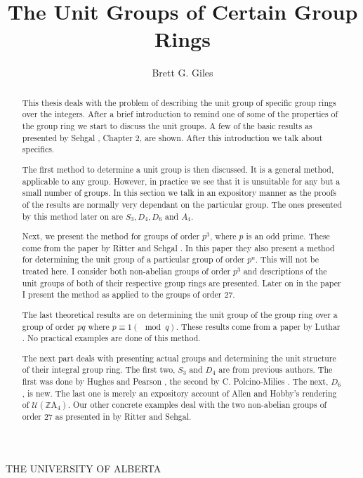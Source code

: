 \documentclass[11pt]{report}
\begin{document}
\nocite{bib:allen1980,bib:hughes1972,bib:luthar1980,bib:polcino1972,bib:sehgal78}
\degree{\MSc}%

%
%

%
%
%
%


%
%

THE UNIVERSITY OF ALBERTA



\title{The Unit Groups of Certain Group Rings}
\author{Brett G. Giles}
\admin
\doublespacing
\begin{abstract}
This thesis deals with the problem of describing the unit group of specific group rings over the integers. 
After a brief introduction to remind one of some of the properties of the group ring we start to discuss 
the unit groups. A few of the basic results as presented by Sehgal 
\cite{bib:sehgal78}, Chapter 2, are shown. 
After this introduction we talk about specifics.

The first method to determine a unit group is then discussed. It is a general method, applicable to
any group.  However, in practice we see that it is unsuitable for any but a small number of groups.
In this section we talk in an expository manner as the proofs of the results are normally very
dependant on the particular group. The ones presented by this method later on are \(S_3, D_4, D_6\)
and \(A_4\).

Next, we present the method for groups of order $p^3$, where $p$ is an odd prime. 
These come from
the paper by Ritter and Sehgal  \cite{bib:ritter1981}.
 In this paper they also present a method for determining the
unit group of a particular group of order $p^n$. This will not be treated here. I consider both
non-abelian groups of order $p^3$ and descriptions of the unit groups of both of their respective
group rings are presented. Later on in the paper I present the method as applied to the groups of
order 27.

The last theoretical results are on determining the unit group of the group ring over a group of
order $pq$ where $p\equiv 1(\mod{q})$. These results come from a 
paper by Luthar  \cite{bib:luthar1980}. No practical
examples are done of this method.

The next part deals with presenting actual groups and determining the unit structure of their
integral group ring. The first two, $S_3$ and $D_4$ are from previous authors. The first was done by
Hughes and Pearson \cite{bib:hughes1972},
 the second by C. Polcino-Milies \cite{bib:polcino1972}. The next, $D_6$, is new. The last one
is merely an expository account of Allen and Hobby's \cite{bib:allen1980}
 rendering of \( \mathcal{U} ( \mathbb{Z}
\mathrm{A}_4)\). Our other concrete examples deal with the two non-abelian groups of order 27 as
presented in  \cite{bib:ritter1981} by Ritter and Sehgal.  
\end{abstract}
\end{document}

